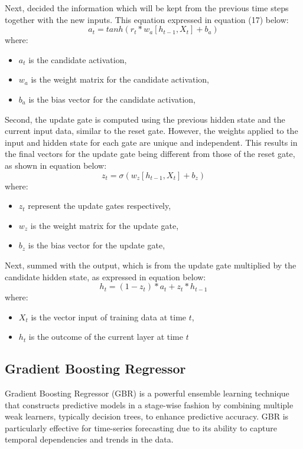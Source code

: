 \documentclass{ieeeojies}
\begin{document}
Next, decided the information which will be kept from the
previous time steps together with the new inputs. This equation
expressed in equation (17) below:
\begin{equation}
    a_t = tanh(r_t * w_a[h_{t - 1}, X_t] + b_a)
\end{equation}
where:
\begin{itemize}
    \item $a_t$ is the candidate activation,
    \item $w_a$ is the weight matrix for the candidate activation,
    \item $b_a$ is the bias vector for the candidate activation,
\end{itemize}

Second, the update gate is computed using the previous hidden state and the current input data, similar to the reset gate. However, the weights applied to the input and hidden state for each gate are unique and independent. This results in the final vectors for the update gate being different from those of the reset gate, as shown in equation below:
\begin{equation}
    z_t = \sigma(w_z[h_{t - 1}, X_t] + b_z)
\end{equation}
where:
\begin{itemize}
    \item $z_t$ represent the update gates respectively,
    \item $w_z$ is the weight matrix for the update gate,
    \item $b_z$ is the bias vector for the update gate,
\end{itemize}

Next, summed with the output, which is from the update gate multiplied by the candidate hidden state, as expressed in equation below:
\begin{equation}
    h_t = (1 - z_t) * a_t + z_t * h_{t - 1}
\end{equation}
where:
\begin{itemize}
    \item $X_t$ is the vector input of training data at time $t$,
    \item $h_t$ is the outcome of the current layer at time $t$
\end{itemize}
\subsection{Gradient Boosting Regressor}

Gradient Boosting Regressor (GBR) is a powerful ensemble learning technique that constructs predictive models in a stage-wise fashion by combining multiple weak learners, typically decision trees, to enhance predictive accuracy. GBR is particularly effective for time-series forecasting due to its ability to capture temporal dependencies and trends in the data.
\end{document}

